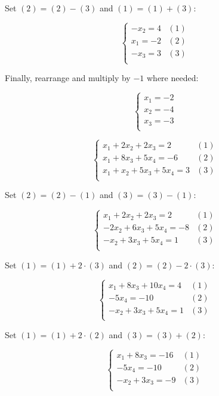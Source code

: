 Set $(2) = (2) - (3)$ and $(1) = (1) + (3)$:

$$
\begin{cases}
    -x_2 = 4 & (1) \\
    x_1 = -2 & (2) \\
    -x_3 = 3 & (3) \\
\end{cases}
$$

Finally, rearrange and multiply by $-1$ where needed:

$$
\begin{cases}
    x_1 = -2 \\
    x_2 = -4 \\
    x_3 = -3 \\
\end{cases}
$$


$$
\begin{cases}
    x_1 + 2x_2 + 2x_3 = 2 & (1) \\
    x_1 + 8x_3 + 5x_4 = -6 & (2) \\
    x_1 + x_2 + 5x_3 + 5x_4 = 3 & (3) \\
\end{cases}
$$

Set $(2) = (2) - (1)$ and $(3) = (3) - (1)$:

$$
\begin{cases}
    x_1 + 2x_2 + 2x_3 = 2 & (1) \\
    -2x_2 + 6x_3 + 5x_4 = -8 & (2) \\
    -x_2 + 3x_3 + 5x_4 = 1 & (3) \\
\end{cases}
$$

Set $(1) = (1) + 2 \cdot (3)$ and $(2) = (2) - 2 \cdot (3)$:

$$
\begin{cases}
    x_1 + 8x_3 + 10x_4 = 4 & (1) \\
    -5x_4 = -10 & (2) \\
    -x_2 + 3x_3 + 5x_4 = 1 & (3) \\
\end{cases}
$$

Set $(1) = (1) + 2 \cdot (2)$ and $(3) = (3) + (2)$:

$$
\begin{cases}
    x_1 + 8x_3 = -16 & (1) \\
    -5x_4 = -10 & (2) \\
    -x_2 + 3x_3 = -9 & (3) \\
\end{cases}
$$

